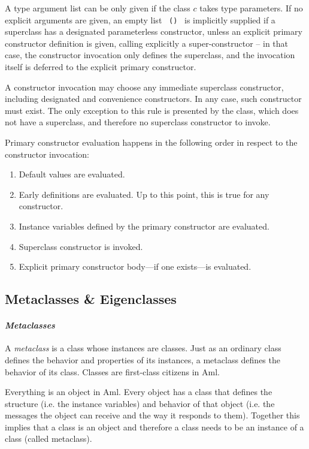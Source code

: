 A type argument list can be only given if the class $c$ takes type parameters. If no explicit arguments are given, an empty list ~\lstinline!()!~ is implicitly supplied if a superclass has a designated parameterless constructor, unless an explicit primary constructor definition is given, calling explicitly a super-constructor -- in that case, the constructor invocation only defines the superclass, and the invocation itself is deferred to the explicit primary constructor. 

A constructor invocation may choose any immediate superclass constructor, including designated and convenience constructors. In any case, such constructor must exist. The only exception to this rule is presented by the  class, which does not have a superclass, and therefore no superclass constructor to invoke. 

Primary constructor evaluation happens in the following order in respect to the constructor invocation: 
\begin{enumerate}
  \item Default values are evaluated. 
  \item Early definitions are evaluated. Up to this point, this is true for any constructor. 
  \item Instance variables defined by the primary constructor are evaluated. 
  \item Superclass constructor is invoked. 
  \item Explicit primary constructor body---if one exists---is evaluated. 
\end{enumerate}





\subsection{Metaclasses \& Eigenclasses}
\label{sec:metaclasses}
\label{sec:eigenclasses}

\paragraph{\em Metaclasses}
A {\em metaclass} is a class whose instances are classes. Just as an ordinary class defines the behavior and properties of its instances, a metaclass defines the behavior of its class. Classes are first-class citizens in Aml. 

Everything is an object in Aml. Every object has a class that defines the structure (i.e. the instance variables) and behavior of that object (i.e. the messages the object can receive and the way it responds to them). Together this implies that a class is an object and therefore a class needs to be an instance of a class (called metaclass). 

